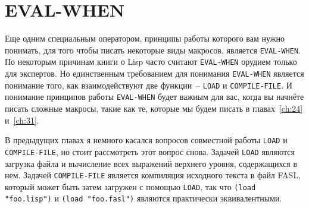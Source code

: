 \section{EVAL-WHEN}

Еще одним специальным оператором, принципы работы которого вам нужно понимать, для того
чтобы писать некоторые виды макросов, является \lstinline{EVAL-WHEN}.  По некоторым
причинам книги о Lisp часто считают \lstinline{EVAL-WHEN} орудием только для экспертов.
Но единственным требованием для понимания \lstinline{EVAL-WHEN} является понимание того,
как взаимодействуют две функции~-- \lstinline{LOAD} и \lstinline{COMPILE-FILE}.  И
понимание принципов работы \lstinline{EVAL-WHEN} будет важным для вас, когда вы начнёте
писать сложные макросы, такие как те, которые мы будем писать в главах~\ref{ch:24}
и~\ref{ch:31}.

В предыдущих главах я немного касался вопросов совместной работы \lstinline{LOAD} и
\lstinline{COMPILE-FILE}, но стоит рассмотреть этот вопрос снова.  Задачей \lstinline{LOAD} являются
загрузка файла и вычисление всех выражений верхнего уровня, содержащихся в нем.  Задачей
\lstinline{COMPILE-FILE} является компиляция исходного текста в файл FASL, который может быть
затем загружен с помощью \lstinline{LOAD}, так что \lstinline{(load "foo.lisp")} и 
\lstinline{(load "foo.fasl")} являются практически эквивалентными.


